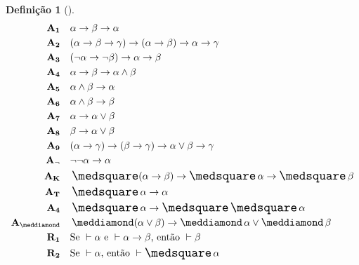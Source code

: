 \documentclass{report}
\newtheorem{definition}{Definição}
\begin{document}
    \begin{definition}[]
        \begin{align*}
            \mathbf{A_1}\quad & \alpha\to\beta\to\alpha \\
            \mathbf{A_2}\quad & (\alpha\to\beta\to\gamma)\to(\alpha\to\beta)\to\alpha\to\gamma \\
            \mathbf{A_3}\quad & (\neg\alpha\to\neg\beta)\to\alpha\to\beta \\
            \mathbf{A_4}\quad & \alpha\to\beta\to\alpha\wedge\beta \\
            \mathbf{A_5}\quad & \alpha\wedge\beta\to\alpha \\
            \mathbf{A_6}\quad & \alpha\wedge\beta\to\beta \\
            \mathbf{A_7}\quad & \alpha\to\alpha\vee\beta \\
            \mathbf{A_8}\quad & \beta\to\alpha\vee\beta \\
            \mathbf{A_9}\quad & (\alpha\to\gamma)\to(\beta\to\gamma)\to\alpha\vee\beta\to\gamma \\
            \mathbf{A_\neg}\quad & \neg\neg\alpha\to\alpha \\
            \mathbf{A_K}\quad & \nec(\alpha\to\beta)\to\nec\alpha\to\nec\beta \\
            \mathbf{A_T}\quad & \nec\alpha\to\alpha \\
            \mathbf{A_4}\quad & \nec\alpha\to\nec\nec\alpha \\
            \mathbf{A_\meddiamond}\quad & \pos(\alpha\vee\beta)\to\pos\alpha\vee\pos\beta \\
            \mathbf{R_1}\quad & \text{Se }\vdash\alpha\text{ e }\vdash\alpha\to\beta\text{, então }\vdash\beta \\
            \mathbf{R_2}\quad & \text{Se }\vdash\alpha\text{, então }\vdash\nec\alpha
        \end{align*}   
    \end{definition}

    
    
\end{document}
